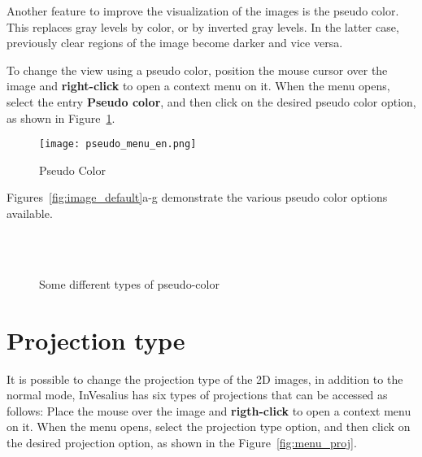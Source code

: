Another feature to improve the visualization of the images is the pseudo color. This replaces gray levels by color, or by inverted gray levels. In the latter case, previously clear regions of the image become darker and vice versa.

To change the view using a pseudo color, position the mouse cursor over the image and \textbf{right-click} to open a context menu on it. When the menu opens, select the entry \textbf{Pseudo color}, and then click on the desired pseudo color option, as shown in Figure~\ref{fig:pseudo_color}.

\begin{figure}[p]
\centering
\texttt{[image: pseudo\_menu\_en.png]}
\caption{Pseudo Color}
\label{fig:pseudo_color}
\end{figure}

Figures~\ref{fig:image_default}a-g demonstrate the various pseudo color options available.

\begin{figure}[h]
  \centering
   \qquad
   \qquad
   \\
   \qquad
   \qquad
  \\
  \caption{Some different types of pseudo-color}
  \label{fig:pseudo_color_types}
\end{figure}

\newpage
\section{Projection type}

It is possible to change the projection type of the 2D images, in addition to the normal mode, InVesalius has six types of projections that can be accessed as follows: Place the mouse over the image and \textbf{rigth-click} to open a context menu on it. When the menu opens, select the projection type option, and then click on the desired projection option, as shown in the Figure~\ref{fig:menu_proj}.

